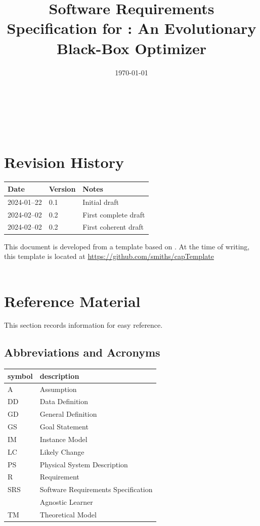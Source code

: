 \documentclass[12pt]{article}
\begin{document}
\title{Software Requirements Specification for \progname: An Evolutionary Black-Box Optimizer} 
\author{\authname}
\date{\today}
	
\maketitle

~\newpage


\tableofcontents

~\newpage

\section*{Revision History}

\begin{tabularx}{\textwidth}{p{3cm}p{2cm}X}
\toprule {\bf Date} & {\bf Version} & {\bf Notes}\\
\midrule
2024-01--22 & 0.1 & Initial draft\\
2024-02--02 & 0.2 & First complete draft\\
2024-02--02 & 0.2 & First coherent draft\\
\bottomrule
\end{tabularx}
This document is developed from a template based on \citet{SmithAndLai2005, SmithEtAl2007,
SmithAndKoothoor2016}. At the time of writing, this template is located at \href{https://github.com/smiths/capTemplate}{https://github.com/smiths/capTemplate}
~\\

~\newpage

\section{Reference Material}

This section records information for easy reference.

\subsection{Abbreviations and Acronyms}

\renewcommand{\arraystretch}{1.2}
\begin{tabular}{l l} 
  \toprule		
  \textbf{symbol} & \textbf{description}\\
  \midrule 
  A & Assumption\\
  DD & Data Definition\\
  GD & General Definition\\
  GS & Goal Statement\\
  IM & Instance Model\\
  LC & Likely Change\\
  PS & Physical System Description\\
  R & Requirement\\
  SRS & Software Requirements Specification\\
  \progname{} & Agnostic Learner\\
  TM & Theoretical Model\\
  \bottomrule
\end{tabular}\\
\end{document}
